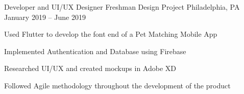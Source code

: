 
\begin{cventries}
  \cventry
	{Developer and UI/UX Designer}
	{Freshman Design Project}
	{Philadelphia, PA}
	{January 2019 – June 2019}
	{\begin{cvitems}
		\item {Used Flutter to develop the font end of a Pet Matching Mobile App}
		\item {Implemented Authentication and Database using Firebase}
		\item {Researched UI/UX and created mockups in Adobe XD}
		\item {Followed Agile methodology throughout the development of the product}
		\end{cvitems}}
\end{cventries}